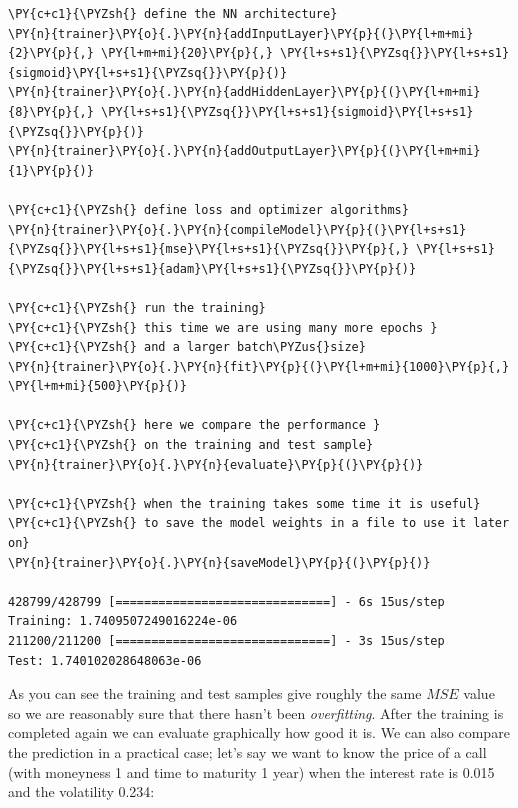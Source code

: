     \begin{tcolorbox}[breakable, size=fbox, boxrule=1pt, pad at break*=1mm,colback=cellbackground, colframe=cellborder]
\begin{Verbatim}[commandchars=\\\{\}]
\PY{c+c1}{\PYZsh{} define the NN architecture}
\PY{n}{trainer}\PY{o}{.}\PY{n}{addInputLayer}\PY{p}{(}\PY{l+m+mi}{2}\PY{p}{,} \PY{l+m+mi}{20}\PY{p}{,} \PY{l+s+s1}{\PYZsq{}}\PY{l+s+s1}{sigmoid}\PY{l+s+s1}{\PYZsq{}}\PY{p}{)}
\PY{n}{trainer}\PY{o}{.}\PY{n}{addHiddenLayer}\PY{p}{(}\PY{l+m+mi}{8}\PY{p}{,} \PY{l+s+s1}{\PYZsq{}}\PY{l+s+s1}{sigmoid}\PY{l+s+s1}{\PYZsq{}}\PY{p}{)}
\PY{n}{trainer}\PY{o}{.}\PY{n}{addOutputLayer}\PY{p}{(}\PY{l+m+mi}{1}\PY{p}{)}
        
\PY{c+c1}{\PYZsh{} define loss and optimizer algorithms}
\PY{n}{trainer}\PY{o}{.}\PY{n}{compileModel}\PY{p}{(}\PY{l+s+s1}{\PYZsq{}}\PY{l+s+s1}{mse}\PY{l+s+s1}{\PYZsq{}}\PY{p}{,} \PY{l+s+s1}{\PYZsq{}}\PY{l+s+s1}{adam}\PY{l+s+s1}{\PYZsq{}}\PY{p}{)}
    
\PY{c+c1}{\PYZsh{} run the training}
\PY{c+c1}{\PYZsh{} this time we are using many more epochs }
\PY{c+c1}{\PYZsh{} and a larger batch\PYZus{}size}
\PY{n}{trainer}\PY{o}{.}\PY{n}{fit}\PY{p}{(}\PY{l+m+mi}{1000}\PY{p}{,} \PY{l+m+mi}{500}\PY{p}{)}

\PY{c+c1}{\PYZsh{} here we compare the performance }
\PY{c+c1}{\PYZsh{} on the training and test sample}
\PY{n}{trainer}\PY{o}{.}\PY{n}{evaluate}\PY{p}{(}\PY{p}{)}

\PY{c+c1}{\PYZsh{} when the training takes some time it is useful}
\PY{c+c1}{\PYZsh{} to save the model weights in a file to use it later on}
\PY{n}{trainer}\PY{o}{.}\PY{n}{saveModel}\PY{p}{(}\PY{p}{)}

428799/428799 [==============================] - 6s 15us/step
Training: 1.7409507249016224e-06
211200/211200 [==============================] - 3s 15us/step
Test: 1.740102028648063e-06
    \end{Verbatim}
\end{tcolorbox}

    As you can see the training and test samples give roughly the same
\(MSE\) value so we are reasonably sure that there hasn't been
\emph{overfitting}. After the training is completed again we can
evaluate graphically how good it is. We can also compare the prediction
in a practical case; let's say we want to know the price of a call (with
moneyness 1 and time to maturity 1 year) when the interest rate is 0.015
and the volatility 0.234:

